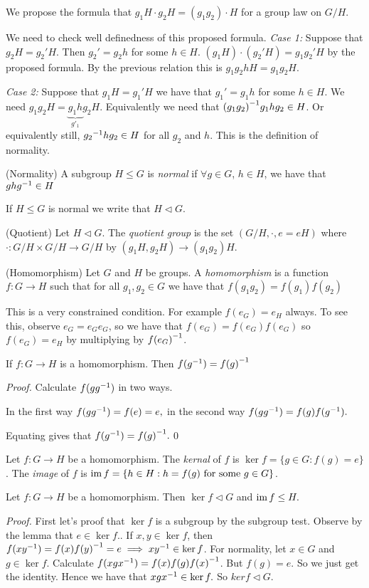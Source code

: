 \documentclass{article}
\newcommand{\nrm}{\triangleleft}
\begin{document}
We propose the formula that $ g_1H\cdot g_2H=(g_1g_2)\cdot H $ for a group law on $ G/H $.

We need to check well definedness of this proposed formula.
\textit{Case 1:} Suppose that $ g_2H=g_2'H. $ Then $ g_2'=g_2h $ for some $ h\in H $. $ (g_1H)\cdot (g_2'H)=g_1g_2'H $ by the proposed formula. By the previous relation this is $ g_1g_2hH=g_1g_2H $.
\par
\textit{Case 2:} Suppose that $ g_1H=g_1'H $ we have that $ g_1'=g_1h $ for some $ h\in H $. We need $ g_1g_2 H = \underbrace{g_1h}_{g'_1}g_2H $. Equivalently we need that $ {(g_1g_2)}^{-1}g_1hg_2\in H $. Or equivalently still, $ {g_2}^{-1}hg_2\in H $ for all $ g_2 $ and $ h $. This is the definition of normality.
\begin{definition}
		(Normality) A subgroup $ H\le G $ is \textit{normal} if $ \forall g \in G $, $ h\in H $, we have that $ gh{g}^{-1}\in H $
\end{definition}
If $ H\le G $ is normal we write that $ H \triangleleft G $.
\begin{definition}
	(Quotient) Let $ H\triangleleft G $. The \textit{quotient group} is the set $ (G/H, \cdot, e=eH) $ where $ \cdot:G/H\times G/H \rightarrow G/H $ by $ (g_1H,g_2H)\rightarrow (g_1g_2)H $.
\end{definition}

\begin{definition}
	(Homomorphism) Let $ G $ and $ H $ be groups. A \textit{homomorphism} is a function $ f: G\rightarrow H $ such that for all $ g_1,g_2\in G $ we have that $ f(g_1g_2)=f(g_1)f(g_2) $
\end{definition}
This is a very constrained condition. For example $ f(e_G)=e_H $ always. To see this, observe $ e_G=e_Ge_G $, so we have that $ f(e_G)=f(e_G)f(e_G) $ so $ f(e_G)=e_H $ by multiplying by $ {f(e_G)}^{-1} $.
\begin{lemma}
	If $ f:G\rightarrow H $ is a homomorphism. Then $ f({g}^{-1})={f(g)}^{-1} $
\end{lemma}
\textit{Proof.} Calculate $ f(g{g}^{-1}) $ in two ways.

In the first way $ f(g{g}^{-1})=f(e)=e, $ in the second way $ f(g{g}^{-1})=f(g)f({g}^{-1}). $

Equating gives that $ f({g}^{-1})={f(g)}^{-1}. $\qed
\begin{definition}
	Let $ f:G\rightarrow H $ be a homomorphism. The \textit{kernal} of $ f $ is $ \ker f =\{g\in G: f(g)=e\} $. The \textit{image} of $ f $ is $ \operatorname{im} f=\{ h\in H: h=f(g)\text{ for some } g\in G\} $.
	\end{definition}
\begin{proposition}
	Let $ f:G\rightarrow H $ be a homomorphism. Then $ \ker f \triangleleft G $ and $ \operatorname{im} f \le H.$
\end{proposition}
\textit{Proof.} First let's proof that $ \ker f $ is a subgroup by the subgroup test. Observe by the lemma that $ e\in\ker f. $. If $ x,y \in\ker f $, then $ f(x{y}^{-1})=f(x){f(y)}^{-1}=e\implies x{y}^{-1}\in \ker f $. For normality, let $ x\in G $ and $ g\in\ker f $. Calculate $ f(xg{x}^{-1})=f(x)f(g){f(x)}^{-1} $. But $ f(g)=e $. So we just get the identity. Hence we have that $ xg{x}^{-1}\in\ker f. $ So $ ker f\nrm G $.
\end{document}
